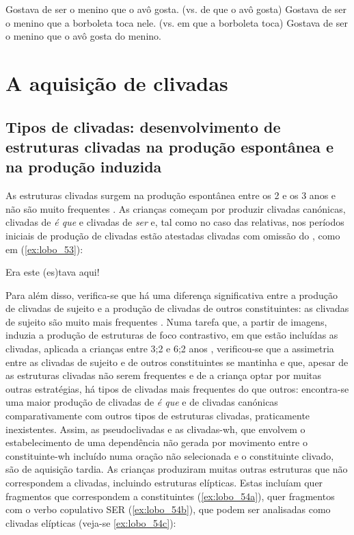 \documentclass[output=paper]{LSP/langsci}
\begin{document}
\ea\label{ex:lobo_52}
\ea\label{ex:lobo_52a} Gostava de ser o menino que o avô gosta. (vs. de que o avô gosta)
\ex\label{ex:lobo_52b} Gostava de ser o menino que a borboleta toca nele. (vs. em que a borboleta toca)
\ex\label{ex:lobo_52c} Gostava de ser o menino que o avô gosta do menino.
\zl

\section{A aquisição de clivadas}
\label{sec:lobo_aquisicao_clivadas}
\subsection{Tipos de clivadas: desenvolvimento de estruturas clivadas na produção espontânea e na produção induzida}
\label{subsec:lobo_tipos_clivadas}
As estruturas clivadas surgem na produção espontânea entre os 2 e os 3 anos e não são muito frequentes \citep{soares2006}. As crianças começam por produzir clivadas canónicas, clivadas de \textit{é que} e clivadas de \textit{ser} e, tal como no caso das relativas, nos períodos iniciais de produção de clivadas estão atestadas clivadas com omissão do , como em (\ref{ex:lobo_53}):

\ea\label{ex:lobo_53} Era este (es)tava aqui!\z

Para além disso, verifica-se que há uma diferença significativa entre a produção de clivadas de sujeito e a produção de clivadas de outros constituintes: as clivadas de sujeito são muito mais frequentes \citep{lobo_etal2016}. Numa tarefa que, a partir de imagens, induzia a produção de estruturas de foco contrastivo, em que estão incluídas as clivadas, aplicada a crianças entre 3;2 e 6;2 anos \citep{lobo_etal2016}, verificou-se que a assimetria entre as clivadas de sujeito e de outros constituintes se mantinha e que, apesar de as estruturas clivadas não serem frequentes e de a criança optar por muitas outras estratégias, há tipos de clivadas mais frequentes do que outros: encontra-se uma maior produção de clivadas de \textit{é que} e de clivadas canónicas comparativamente com outros tipos de estruturas clivadas, praticamente inexistentes. Assim, as pseudoclivadas e as clivadas-wh, que envolvem o estabelecimento de uma dependência não gerada por movimento entre o constituinte-wh incluído numa oração não selecionada e o constituinte clivado, são de aquisição tardia. As crianças produziram muitas outras estruturas que não correspondem a clivadas, incluindo estruturas elípticas. Estas incluíam quer fragmentos que correspondem a constituintes (\ref{ex:lobo_54a}), quer fragmentos com o verbo copulativo SER (\ref{ex:lobo_54b}), que podem ser analisadas como clivadas elípticas (veja-se \ref{ex:lobo_54c}):
\end{document}
